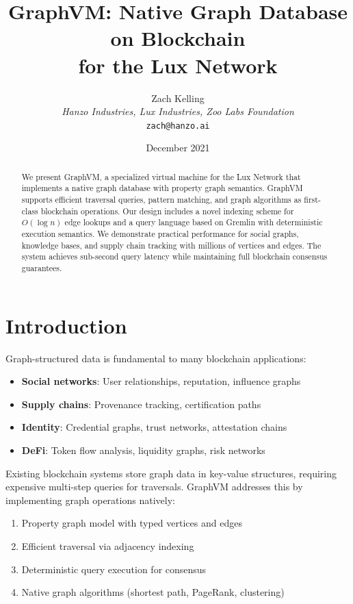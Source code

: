 \documentclass[11pt,a4paper]{article}
\title{\textbf{GraphVM: Native Graph Database on Blockchain\\for the Lux Network}}
\author{Zach Kelling\\
\textit{Hanzo Industries, Lux Industries, Zoo Labs Foundation}\\
\texttt{zach@hanzo.ai}}
\date{December 2021}
\theoremstyle{definition}
\begin{document}
\maketitle

\begin{abstract}
We present GraphVM, a specialized virtual machine for the Lux Network that implements a native graph database with property graph semantics. GraphVM supports efficient traversal queries, pattern matching, and graph algorithms as first-class blockchain operations. Our design includes a novel indexing scheme for $O(\log n)$ edge lookups and a query language based on Gremlin with deterministic execution semantics. We demonstrate practical performance for social graphs, knowledge bases, and supply chain tracking with millions of vertices and edges. The system achieves sub-second query latency while maintaining full blockchain consensus guarantees.
\end{abstract}

\section{Introduction}

Graph-structured data is fundamental to many blockchain applications:

\begin{itemize}
    \item \textbf{Social networks}: User relationships, reputation, influence graphs
    \item \textbf{Supply chains}: Provenance tracking, certification paths
    \item \textbf{Identity}: Credential graphs, trust networks, attestation chains
    \item \textbf{DeFi}: Token flow analysis, liquidity graphs, risk networks
\end{itemize}

Existing blockchain systems store graph data in key-value structures, requiring expensive multi-step queries for traversals. GraphVM addresses this by implementing graph operations natively:

\begin{enumerate}
    \item Property graph model with typed vertices and edges
    \item Efficient traversal via adjacency indexing
    \item Deterministic query execution for consensus
    \item Native graph algorithms (shortest path, PageRank, clustering)
\end{enumerate}
\end{document}

